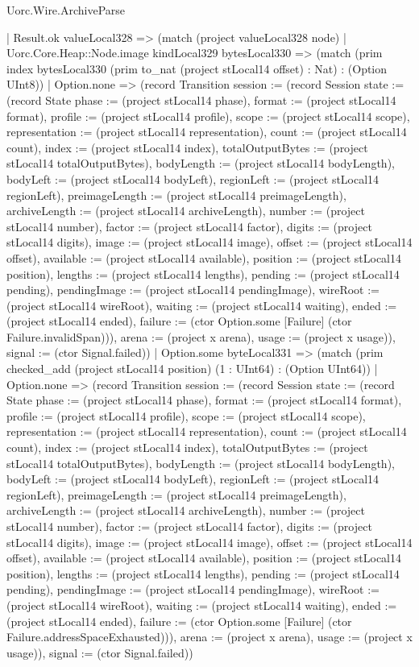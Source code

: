 \begin{lexlean}{Uorc.Wire.ArchiveParse}
\begin{semanticmodule}
{          | Result.ok valueLocal328 => (match (project valueLocal328 node)
            | Uorc.Core.Heap::Node.image kindLocal329 bytesLocal330 => (match (prim index bytesLocal330 (prim to_nat (project stLocal14 offset) : Nat) : (Option UInt8))
              | Option.none => (record Transition {session := (record Session {state := (record State {phase := (project stLocal14 phase), format := (project stLocal14 format), profile := (project stLocal14 profile), scope := (project stLocal14 scope), representation := (project stLocal14 representation), count := (project stLocal14 count), index := (project stLocal14 index), totalOutputBytes := (project stLocal14 totalOutputBytes), bodyLength := (project stLocal14 bodyLength), bodyLeft := (project stLocal14 bodyLeft), regionLeft := (project stLocal14 regionLeft), preimageLength := (project stLocal14 preimageLength), archiveLength := (project stLocal14 archiveLength), number := (project stLocal14 number), factor := (project stLocal14 factor), digits := (project stLocal14 digits), image := (project stLocal14 image), offset := (project stLocal14 offset), available := (project stLocal14 available), position := (project stLocal14 position), lengths := (project stLocal14 lengths), pending := (project stLocal14 pending), pendingImage := (project stLocal14 pendingImage), wireRoot := (project stLocal14 wireRoot), waiting := (project stLocal14 waiting), ended := (project stLocal14 ended), failure := (ctor Option.some [Failure] (ctor Failure.invalidSpan))}), arena := (project x arena), usage := (project x usage)}), signal := (ctor Signal.failed)})
              | Option.some byteLocal331 => (match (prim checked_add (project stLocal14 position) (1 : UInt64) : (Option UInt64))
                | Option.none => (record Transition {session := (record Session {state := (record State {phase := (project stLocal14 phase), format := (project stLocal14 format), profile := (project stLocal14 profile), scope := (project stLocal14 scope), representation := (project stLocal14 representation), count := (project stLocal14 count), index := (project stLocal14 index), totalOutputBytes := (project stLocal14 totalOutputBytes), bodyLength := (project stLocal14 bodyLength), bodyLeft := (project stLocal14 bodyLeft), regionLeft := (project stLocal14 regionLeft), preimageLength := (project stLocal14 preimageLength), archiveLength := (project stLocal14 archiveLength), number := (project stLocal14 number), factor := (project stLocal14 factor), digits := (project stLocal14 digits), image := (project stLocal14 image), offset := (project stLocal14 offset), available := (project stLocal14 available), position := (project stLocal14 position), lengths := (project stLocal14 lengths), pending := (project stLocal14 pending), pendingImage := (project stLocal14 pendingImage), wireRoot := (project stLocal14 wireRoot), waiting := (project stLocal14 waiting), ended := (project stLocal14 ended), failure := (ctor Option.some [Failure] (ctor Failure.addressSpaceExhausted))}), arena := (project x arena), usage := (project x usage)}), signal := (ctor Signal.failed)})
}
\end{semanticmodule}
\end{lexlean}
